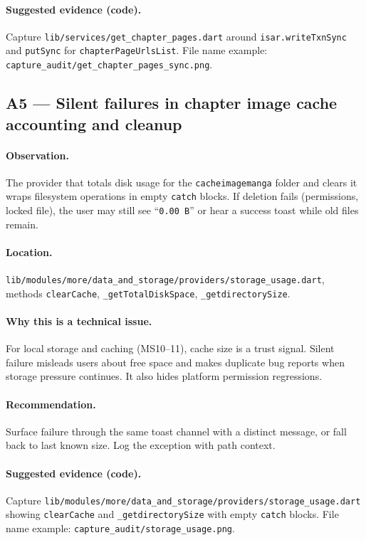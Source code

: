 \paragraph{Suggested evidence (code).}
Capture \texttt{lib/services/get\_chapter\_pages.dart} around \texttt{isar.writeTxnSync} and \texttt{putSync} for \texttt{chapterPageUrlsList}. File name example: \texttt{capture\_audit/get\_chapter\_pages\_sync.png}.

\subsection*{A5 --- Silent failures in chapter image cache accounting and cleanup}
\paragraph{Observation.}
The provider that totals disk usage for the \texttt{cacheimagemanga} folder and clears it wraps filesystem operations in empty \texttt{catch} blocks. If deletion fails (permissions, locked file), the user may still see ``\texttt{0.00 B}'' or hear a success toast while old files remain.

\paragraph{Location.}
\texttt{lib/modules/more/data\_and\_storage/providers/storage\_usage.dart}, methods \texttt{clearCache}, \texttt{\_getTotalDiskSpace}, \texttt{\_getdirectorySize}.

\paragraph{Why this is a technical issue.}
For local storage and caching (MS10--11), cache size is a trust signal. Silent failure misleads users about free space and makes duplicate bug reports when storage pressure continues. It also hides platform permission regressions.

\paragraph{Recommendation.}
Surface failure through the same toast channel with a distinct message, or fall back to last known size. Log the exception with path context.

\paragraph{Suggested evidence (code).}
Capture \texttt{lib/modules/more/data\_and\_storage/providers/storage\_usage.dart} showing \texttt{clearCache} and \texttt{\_getdirectorySize} with empty \texttt{catch} blocks. File name example: \texttt{capture\_audit/storage\_usage.png}.

